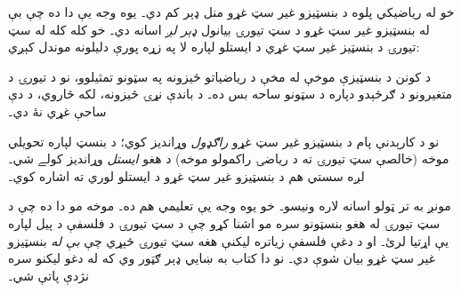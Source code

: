 \documentclass[../../../include/open-logic-section]{subfiles}
\begin{document}
خو له رياضيکي پلوه د بنسټيزو غير سټ غړو منل ډېر کم دي۔
يوه وجه يې دا ده چې بې له بنسټيزو غير سټ غړو د سټ تيورۍ
بيانول \emph{ډېر لږ} اسانه دي۔ خو کله کله له سټ تيورۍ د
بنسټيز غير سټ غړي د ايستلو لپاره لا په زړه پورې دليلونه
موندل کېږي:
\begin{explain}
  د کونن د بنسټيزې موخې له مخې د رياضياتو څيزونه په سټونو
  تمثيلوو، نو د تيورۍ د متغيرونو د ګرځېدو دپاره د سټونو
  ساحه بس ده۔ د باندې نړۍ څيزونه، لکه څاروي، د دې ساحې
  غړي نۀ دي۔ \citep[p.~8]{Kunen1980}
\end{explain}
نو د کارېدنې پام د بنسټيزو غير سټ غړو \emph{راګډول} وړانديز
کوي؛ د بنسټ لپاره تحويلي موخه (خالصې سټ تيورۍ ته د رياضۍ
راکمولو موخه) د هغو \emph{ايستل} وړانديز کولے شي۔ لږه
سستي هم د بنسټيزو غير سټ غړو د ايستلو لوري ته اشاره کوي۔

مونږ به تر ټولو اسانه لاره ونيسو۔ خو يوه وجه يې تعليمي هم
ده۔ موخه مو دا ده چې د سټ تيورۍ له هغو بنسټونو سره مو اشنا
کړو چې د سټ تيورۍ د فلسفې د پيل لپاره يې اړتيا لرئ۔ او د
دغې فلسفې زياتره ليکنې هغه سټ تيورۍ څېړي چې \emph{بې له}
بنسټيزو غير سټ غړو بيان شوې دي۔ نو دا کتاب به ښايي ډېر
ګټور وي که له دغو ليکنو سره نژدې پاتې شي۔
\end{document}
